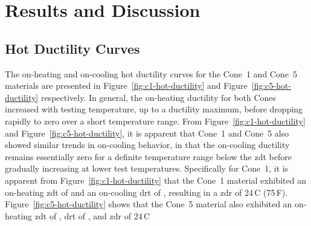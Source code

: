 \chapter{Results and Discussion} \label{ch:results-discussion}

\section{Hot Ductility Curves}
The on-heating and on-cooling hot ductility curves for the Cone~1 and Cone~5 materials are presented in Figure~\ref{fig:c1-hot-ductility} and Figure~\ref{fig:c5-hot-ductility} respectively.  In general, the on-heating ductility for both Cones increased with testing temperature, up to a ductility maximum, before dropping rapidly to zero over a short temperature range.  From Figure~\ref{fig:c1-hot-ductility} and Figure~\ref{fig:c5-hot-ductility}, it is apparent that Cone~1 and Cone~5 also showed similar trends in on-cooling behavior, in that the on-cooling ductility remains essentially zero for a definite temperature range below the \gls{zdt} before gradually increasing at lower test temperatures.  Specifically for Cone~1, it is apparent from Figure~\ref{fig:c1-hot-ductility} that the Cone~1 material exhibited an on-heating \gls{zdt} of  and an on-cooling \gls{drt} of , resulting in a \gls{zdr} of 24\,C\textdegree{} (75\,F\textdegree{}).  Figure~\ref{fig:c5-hot-ductility} shows that the Cone~5 material also exhibited an on-heating \gls{zdt} of , \gls{drt} of , and \gls{zdr} of 24\,C
